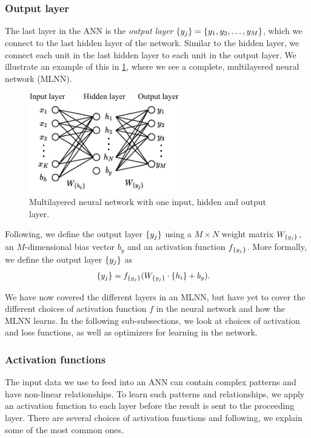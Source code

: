 \subsubsection{Output layer}
\label{sec:ann-output-layer}
The last layer in the ANN is the \textit{output layer} $\left\{ {y}_{j} \right\} = \left\{ y_1, y_2, \ldots, y_M \right\}$, which we connect to the last hidden layer of the network. Similar to the hidden layer, we connect each unit in the last hidden layer to each unit in the output layer. We illustrate an example of this in \cref{fig:mlnn-one-hidden}, where we see a complete, multilayered neural network (MLNN).
\begin{figure}[H]
    \centering
    \includegraphics[width=0.6\textwidth]{thesis/figures/artificial-neural-network_cropped.pdf}
    \caption{Multilayered neural network with one input, hidden and output layer.}
    \label{fig:mlnn-one-hidden}
\end{figure}

Following, we define the output layer $\left\{ {y}_{j} \right\}$ using a $M \times N$ weight matrix $W_{\left\{ {y}_{j} \right\}}$, an $M$-dimensional bias vector $b_y$ and an activation function $f_{\left\{ {y}_{j} \right\}}$. More formally, we define the output layer $\left\{ {y}_{j} \right\}$ as
\begin{align}
    \label{eqn:output-layer-ann}
    \left\{ {y}_{j} \right\} &= f_{\left\{ {y}_{j} \right\}}(W_{\left\{ {y}_{j} \right\}} \cdot \left\{ {h}_{i} \right\} + b_y).
\end{align}

We have now covered the different layers in an MLNN, but have yet to cover the different choices of activation function $f$ in the neural network and how the MLNN learns. In the following sub-subsections, we look at choices of activation and loss functions, as well as optimizers for learning in the network.

\subsubsection{Activation functions}
\label{sec:ann-activation-functions}
The input data we use to feed into an ANN can contain complex patterns and have non-linear relationships. To learn such patterns and relationships, we apply an activation function to each layer before the result is sent to the proceeding layer. There are several choices of activation functions and following, we explain some of the most common ones.

